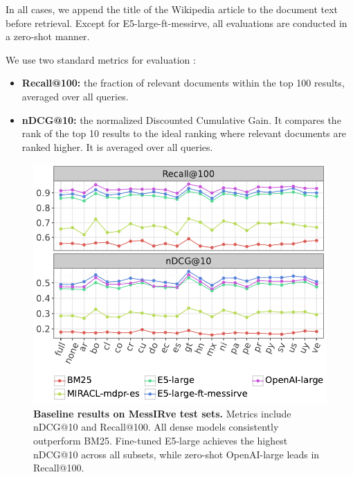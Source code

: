 \documentclass[11pt]{article}
\begin{document}
In all cases, we append the title of the Wikipedia article to the document text before retrieval. Except for E5-large-ft-messirve, all evaluations are conducted in a zero-shot manner.

We use two standard metrics for evaluation \citep{thakur2021beir, zhang2023miracl}:

\begin{itemize}[wide, itemindent=, itemsep=0pt]
  \item \textbf{Recall@100:} the fraction of relevant documents within the top 100 results, averaged over all queries.
  \item \textbf{nDCG@10:} the normalized Discounted Cumulative Gain. It compares the rank of the top 10 results to the ideal ranking  where relevant documents are ranked higher. It is averaged over all queries.
\end{itemize}




\begin{figure}[ht]
  \centering
  \includegraphics[width=\columnwidth]{plots/models_results.pdf}
  \caption{\textbf{Baseline results on MessIRve test sets.} Metrics include nDCG@10 and Recall@100. All dense models consistently outperform BM25. Fine-tuned E5-large achieves the highest nDCG@10 across all subsets, while zero-shot OpenAI-large leads in Recall@100.
  }
  \label{fig:models_results}
\end{figure}
\end{document}
